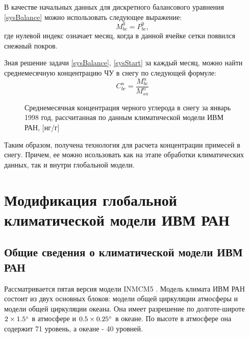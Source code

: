 \documentclass[a4paper, fontsize=14pt]{scrartcl}
\begin{document}
В качестве начальных данных для дискретного балансового уравнения \eqref{sysBalance} можно использовать следующее выражение:
\begin{equation}
    M_{bc}^0 = P_{bc}^0, \label{sysStart}
\end{equation}
где нулевой индекс означает месяц, когда в данной ячейке сетки появился снежный покров. 

Зная решение задачи \eqref{sysBalance}, \eqref{sysStart} за каждый месяц, можно найти среднемесячную концентрацию ЧУ в снегу по следующей формуле:
\begin{equation}
   C_{bc}^n = \dfrac{M_{bc}^n}{M_{sn}^n}  \label{sys}
\end{equation}

\begin{figure}[h]
    \caption{Среднемесячная концентрация черного углерода в снегу за январь 1998 год, рассчитанная по данным климатической модели ИВМ РАН, [нг/г]}
    \label{fig:image}
\end{figure}

Таким образом, получена технология для расчета концентрации примесей в снегу. Причем, ее можно исользовать как на этапе обработки климатических данных, так и внутри глобальной модели.

\newpage
\section{Модификация глобальной климатической модели ИВМ РАН}

\subsection{Общие сведения о климатической модели ИВМ РАН}

Рассматривается пятая версия модели INMCM5 \cite{Volodin2017}. Модель климата ИВМ РАН состоит из двух основных блоков: модели общей циркуляции атмосферы и модели общей циркуляции океана. Она имеет разрешение по долготе-широте $2 \times 1.5\degree$ в атмосфере и $0.5 \times 0.25\degree$ в океане. По высоте в атмосфере она содержит 71 уровень, а океане - 40 уровней. 
\end{document}
